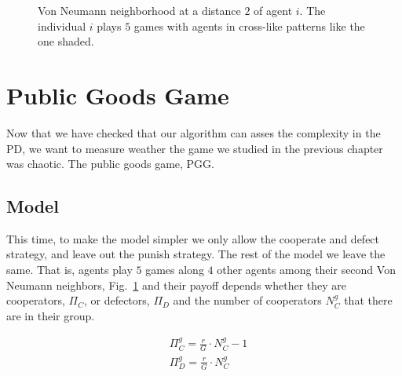 \begin{figure}
\centering
{}
\caption{Von Neumann neighborhood at a distance $2$ of agent $i$. The individual $i$ plays $5$ games with agents in cross-like patterns like the one shaded.}
\label{fig:VonNeumman2Neigh}
\end{figure}



\section{Public Goods Game}

Now that we have checked that our algorithm can asses the complexity in the PD, we want to measure weather the game we studied in the previous chapter was chaotic. The public goods game, PGG. 

\subsection{Model}

This time, to make the model simpler we only allow the cooperate and defect strategy, and leave out the punish strategy. The rest of the model we leave the same. That is, agents play $5$ games along $4$ other agents among their second Von Neumann neighbors, Fig.~\ref{fig:VonNeumman2Neigh} and their payoff depends whether they are cooperators, $\Pi_C$, or defectors, $\Pi_D$ and the number of cooperators $N_C^g$ that there are in their group.

\begin{equation}
    \begin{split}
    	&\Pi_C^g=\frac{r}{G}\cdot N_C^g-1 \\
    	&\Pi_D^g=\frac{r}{G}\cdot N_C^g
    \end{split}    
\end{equation}

